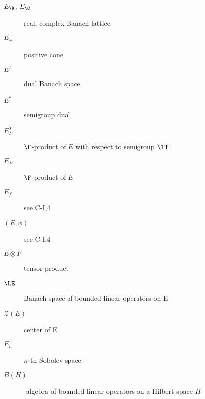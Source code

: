 



\begin{description}
\item[$E_{\R}$, $E_{\C}$] real, complex Banach lattice
\item[$E_{+}$] positive cone
\item[$E'$] dual Banach space
\item[$E^*$] semigroup dual
\item[$E_{F}^{T}$] $ \F $-product of $ E $ with respect to semigroup $\TT$
\item[$E_{F}$] $ \F $-product of $ E $
\item[$E_{f}$] see C-I,4
\item[$(E,\phi)$] see C-I,4
\item[$E\otimes F$] tensor product
\item[$\LE$] Banach space of bounded linear operators on E
\item[$\mathcal{Z}(E)$] center of E
\item[$E_{n}$] $ n $-th Sobolev space
\item[$B(H)$] \WA-algebra of bounded linear operators on a Hilbert space $ H $

\end{description}
